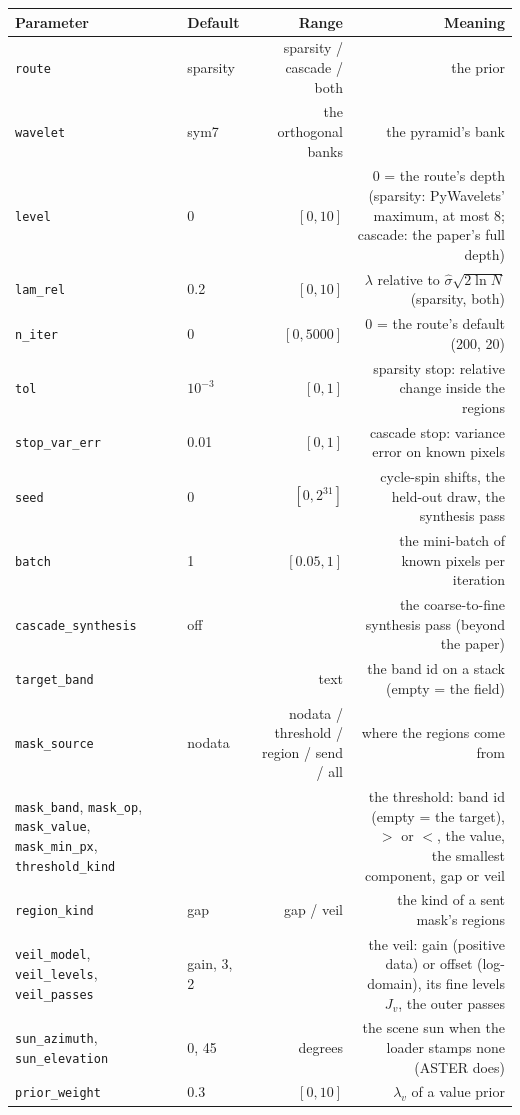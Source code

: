 \documentclass[10pt]{article}
\begin{document}
\begin{longtable}{P l R N}
\toprule Parameter & Default & Range & Meaning \\ \midrule
\texttt{route} & sparsity & sparsity / cascade / both & the prior \\
\texttt{wavelet} & sym7 & the orthogonal banks & the pyramid's bank \\
\texttt{level} & 0 & $[0,10]$ & $0$ = the route's depth (sparsity: PyWavelets' maximum, at most 8; cascade: the paper's full depth) \\
\texttt{lam\_rel} & 0.2 & $[0,10]$ & $\lambda$ relative to $\hat\sigma\sqrt{2\ln N}$ (sparsity, both) \\
\texttt{n\_iter} & 0 & $[0,5000]$ & $0$ = the route's default (200, 20) \\
\texttt{tol} & $10^{-3}$ & $[0,1]$ & sparsity stop: relative change inside the regions \\
\texttt{stop\_var\_err} & 0.01 & $[0,1]$ & cascade stop: variance error on known pixels \\
\texttt{seed} & 0 & $[0,2^{31}]$ & cycle-spin shifts, the held-out draw, the synthesis pass \\
\texttt{batch} & 1 & $[0.05,1]$ & the mini-batch of known pixels per iteration \\
\texttt{cascade\_synthesis} & off & & the coarse-to-fine synthesis pass (beyond the paper) \\
\texttt{target\_band} & & text & the band id on a stack (empty = the field) \\
\texttt{mask\_source} & nodata & nodata / threshold / region / send / all & where the regions come from \\
\texttt{mask\_band}, \texttt{mask\_op}, \texttt{mask\_value}, \texttt{mask\_min\_px}, \texttt{threshold\_kind} & & & the threshold: band id (empty = the target), $>$ or $<$, the value, the smallest component, gap or veil \\
\texttt{region\_kind} & gap & gap / veil & the kind of a sent mask's regions \\
\texttt{veil\_model}, \texttt{veil\_levels}, \texttt{veil\_passes} & gain, 3, 2 & & the veil: gain (positive data) or offset (log-domain), its fine levels $J_v$, the outer passes \\
\texttt{sun\_azimuth}, \texttt{sun\_elevation} & 0, 45 & degrees & the scene sun when the loader stamps none (ASTER does) \\
\texttt{prior\_weight} & 0.3 & $[0,10]$ & $\lambda_v$ of a value prior \\

\end{longtable}
\end{document}
